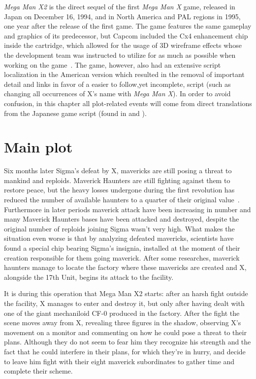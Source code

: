 
\textit{Mega Man X2} is the direct sequel of the first \textit{Mega Man X} game, released in Japan on December 16, 1994, and in North America and PAL regions in 1995, one year after the release of the first game. The game features the same gameplay and graphics of its predecessor, but  Capcom included the Cx4 enhancement chip inside the cartridge, which allowed for the usage of 3D wireframe effects whose the development team was instructed to utilize for as much as possible when working on the game~\cite{wiki:MMX2}. The game, however, also had an extensive script localization in the American version which resulted in the removal of important detail and links in favor of a easier to follow,yet incomplete, script (such as changing all occurrences of X's name with \textit{Mega Man X}). In order to avoid confusion, in this chapter all plot-related events will come from direct translations from the Japanese game script (found in \cite{wordpress:X2_japanese_script} and \cite{gamesfaq:X2_japanese_script}).

\section{Main plot}
Six months later Sigma's defeat by X, mavericks are still posing a threat to mankind and reploids. Maverick Haunters are still fighting against them to restore peace, but the heavy losses undergone during the first revolution has reduced the number of available haunters to a quarter of their original value~\cite{Xcoll1:Manual_X2}. Furthermore in later periods maverick attack have been increasing in number and many Maverick Haunters bases have been attacked and destroyed, despite the original number of reploids joining Sigma wasn't very high. What makes the situation even worse is that by analyzing defeated mavericks, scientists have found a special chip bearing Sigma's insignia, installed at the moment of their creation responsible for them going maverick. After some researches, maverick haunters manage to locate the factory where these mavericks are created and X, alongside the 17th Unit, begins its attack to the facility.

It is during this operation that Mega Man X2 starts: after an harsh fight outside the facility, X manages to enter and destroy it, but only after having dealt with one of the giant mechaniloid CF-0 produced in the factory. After the fight the scene moves away from X, revealing three figures in the shadow, observing X's movement on a monitor and commenting on how he could pose a threat to their plans. Although they do not seem to fear him they recognize his strength and the fact that he could interfere in their plans, for which they're in hurry, and decide to leave him fight with their eight maverick subordinates to gather time and complete their scheme.

